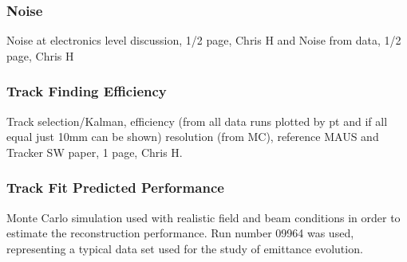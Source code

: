 \subsubsection{Noise}
Noise at electronics level discussion, 1/2 page, Chris H
and
Noise from data, 1/2 page, Chris H

\subsubsection{Track Finding Efficiency}
Track selection/Kalman, efficiency (from all data runs plotted by pt and if all equal just 10mm can be shown) resolution (from MC), reference MAUS and Tracker SW paper, 1 page, Chris H.

\subsubsection{Track Fit Predicted Performance}

Monte Carlo simulation used with realistic field and beam conditions in order to estimate the reconstruction performance. Run number 09964 was used, representing a typical data set used for the study of emittance evolution.


